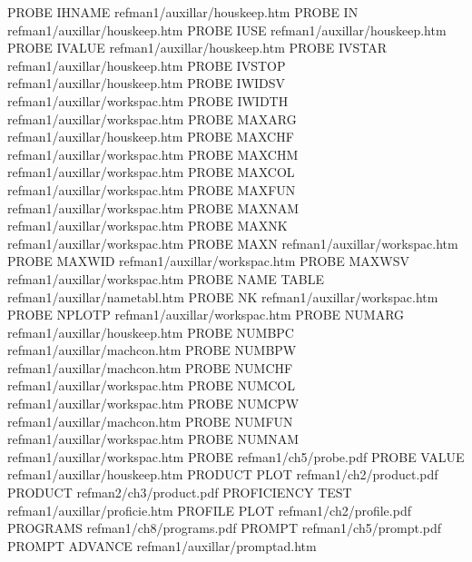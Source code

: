 PROBE IHNAME                            refman1/auxillar/houskeep.htm
PROBE IN                                refman1/auxillar/houskeep.htm
PROBE IUSE                              refman1/auxillar/houskeep.htm
PROBE IVALUE                            refman1/auxillar/houskeep.htm
PROBE IVSTAR                            refman1/auxillar/houskeep.htm
PROBE IVSTOP                            refman1/auxillar/houskeep.htm
PROBE IWIDSV                            refman1/auxillar/workspac.htm
PROBE IWIDTH                            refman1/auxillar/workspac.htm
PROBE MAXARG                            refman1/auxillar/houskeep.htm
PROBE MAXCHF                            refman1/auxillar/workspac.htm
PROBE MAXCHM                            refman1/auxillar/workspac.htm
PROBE MAXCOL                            refman1/auxillar/workspac.htm
PROBE MAXFUN                            refman1/auxillar/workspac.htm
PROBE MAXNAM                            refman1/auxillar/workspac.htm
PROBE MAXNK                             refman1/auxillar/workspac.htm
PROBE MAXN                              refman1/auxillar/workspac.htm
PROBE MAXWID                            refman1/auxillar/workspac.htm
PROBE MAXWSV                            refman1/auxillar/workspac.htm
PROBE NAME TABLE                        refman1/auxillar/nametabl.htm
PROBE NK                                refman1/auxillar/workspac.htm
PROBE NPLOTP                            refman1/auxillar/workspac.htm
PROBE NUMARG                            refman1/auxillar/houskeep.htm
PROBE NUMBPC                            refman1/auxillar/machcon.htm
PROBE NUMBPW                            refman1/auxillar/machcon.htm
PROBE NUMCHF                            refman1/auxillar/workspac.htm
PROBE NUMCOL                            refman1/auxillar/workspac.htm
PROBE NUMCPW                            refman1/auxillar/machcon.htm
PROBE NUMFUN                            refman1/auxillar/workspac.htm
PROBE NUMNAM                            refman1/auxillar/workspac.htm
PROBE                                   refman1/ch5/probe.pdf
PROBE VALUE                             refman1/auxillar/houskeep.htm
PRODUCT PLOT                            refman1/ch2/product.pdf
PRODUCT                                 refman2/ch3/product.pdf
PROFICIENCY TEST                        refman1/auxillar/proficie.htm
PROFILE PLOT                            refman1/ch2/profile.pdf
PROGRAMS                                refman1/ch8/programs.pdf
PROMPT                                  refman1/ch5/prompt.pdf
PROMPT ADVANCE                          refman1/auxillar/promptad.htm
